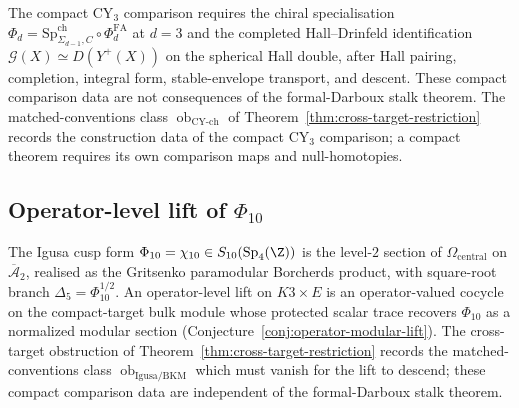 The compact CY$_3$ comparison requires the chiral specialisation
$\Phi_d=\mathrm{Sp}^{\mathrm{ch}}_{\Sigma_{d-1},C}\circ
\Phi^{\mathrm{FA}}_d$ at $d=3$ and the completed Hall--Drinfeld
identification
$\mathcal G(X)\simeq D(Y^+(X))$ on the spherical Hall double, after
Hall pairing, completion, integral form, stable-envelope transport,
and descent.  These compact comparison data are not consequences of the
formal-Darboux stalk theorem.  The matched-conventions class
$\operatorname{ob}_{\mathrm{CY\mbox{-}ch}}$ of
Theorem~\ref{thm:cross-target-restriction} records the construction
data of the compact CY$_3$ comparison; a compact theorem requires its
own comparison maps and null-homotopies.

\subsection{Operator-level lift of
  \texorpdfstring{$\Phi_{10}$}{Phi10}}\label{ssec:comparison-phi10-operator}

The Igusa cusp form $\Phi_{10}=\chi_{10}\in
S_{10}(\mathrm{Sp}_4(\Z))$ is the level-$2$ section of
$\Omega_{\mathrm{central}}$ on $\overline{\mathcal A}_2$, realised
as the Gritsenko paramodular Borcherds product, with square-root
branch $\Delta_5=\Phi_{10}^{1/2}$.  An operator-level lift on
\(K3\times E\) is an operator-valued cocycle on the
compact-target bulk module whose protected scalar trace recovers
$\Phi_{10}$ as a normalized modular section
(Conjecture~\ref{conj:operator-modular-lift}).  The cross-target
obstruction of Theorem~\ref{thm:cross-target-restriction} records the
matched-conventions class
$\operatorname{ob}_{\mathrm{Igusa/BKM}}$ which must vanish for the
lift to descend; these compact comparison data are independent of the
formal-Darboux stalk theorem.
